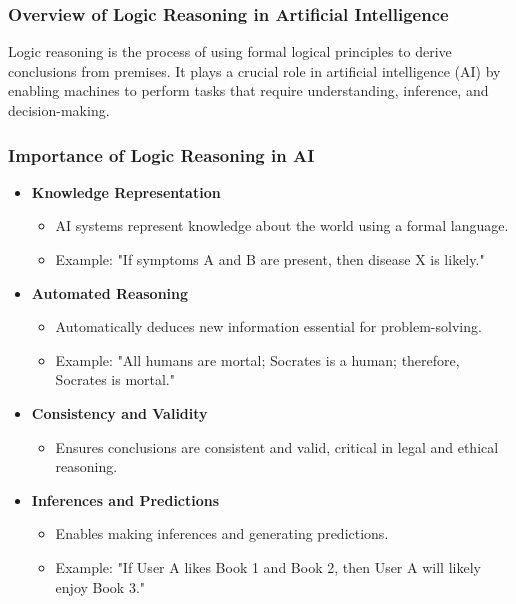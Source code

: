 \documentclass[aspectratio=169]{beamer}
\begin{document}
\frame{\titlepage}

\begin{frame}[fragile]
    \frametitle{Overview of Logic Reasoning in Artificial Intelligence}
    Logic reasoning is the process of using formal logical principles to derive conclusions from premises. 
    It plays a crucial role in artificial intelligence (AI) by enabling machines to perform tasks that require understanding, inference, and decision-making.
\end{frame}

\begin{frame}[fragile]
    \frametitle{Importance of Logic Reasoning in AI}
    \begin{itemize}
        \item \textbf{Knowledge Representation}
        \begin{itemize}
            \item AI systems represent knowledge about the world using a formal language.
            \item Example: "If symptoms A and B are present, then disease X is likely."
        \end{itemize}

        \item \textbf{Automated Reasoning}
        \begin{itemize}
            \item Automatically deduces new information essential for problem-solving.
            \item Example: "All humans are mortal; Socrates is a human; therefore, Socrates is mortal."
        \end{itemize}

        \item \textbf{Consistency and Validity}
        \begin{itemize}
            \item Ensures conclusions are consistent and valid, critical in legal and ethical reasoning.
        \end{itemize}

        \item \textbf{Inferences and Predictions}
        \begin{itemize}
            \item Enables making inferences and generating predictions.
            \item Example: "If User A likes Book 1 and Book 2, then User A will likely enjoy Book 3."
        \end{itemize}
    \end{itemize}
\end{frame}
\end{document}
